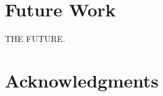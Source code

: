 \documentclass{acm_proc_article-sp}
\begin{document}
\section{Future Work}
THE FUTURE.























\section{Acknowledgments}

%


%
%
\appendix
\balancecolumns
\end{document}
